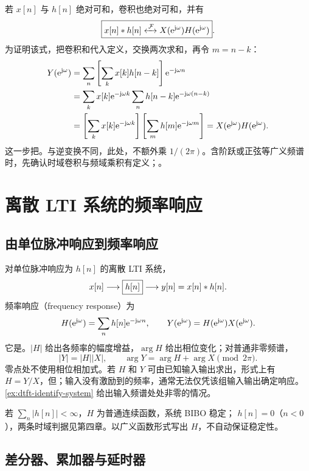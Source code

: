 若 $x[n]$ 与 $h[n]$ 绝对可和，卷积也绝对可和，并有
\begin{equation}
  \boxed{x[n]\mathbin{\ast} h[n]\mathrel{\xleftrightarrow{\,\mathcal{F}\,}}
    X(\mathrm{e}^{\mathrm{j}\omega})H(\mathrm{e}^{\mathrm{j}\omega})}.
  \label{eq:dtft-convolution}
\end{equation}
为证明该式，把卷积和代入定义，交换两次求和，再令 $m=n-k$：
\begin{align*}
  Y(\mathrm{e}^{\mathrm{j}\omega})
    &=\sum_n\left[\sum_k x[k]h[n-k]\right]\mathrm{e}^{-\mathrm{j}\omega n}\\
    &=\sum_k x[k]\mathrm{e}^{-\mathrm{j}\omega k}
      \sum_n h[n-k]\mathrm{e}^{-\mathrm{j}\omega(n-k)}\\
    &=\left[\sum_k x[k]\mathrm{e}^{-\mathrm{j}\omega k}\right]
      \left[\sum_m h[m]\mathrm{e}^{-\mathrm{j}\omega m}\right]
      =X(\mathrm{e}^{\mathrm{j}\omega})H(\mathrm{e}^{\mathrm{j}\omega}).
\end{align*}
这一步把。与逆变换不同，此处，不额外乘 $1/(2\pi)$。含阶跃或正弦等广义频谱时，先确认时域卷积与频域乘积有定义；。

\section{离散 LTI 系统的频率响应}
\label{sec:dtft-lti}

\subsection{由单位脉冲响应到频率响应}

对单位脉冲响应为 $h[n]$ 的离散 LTI 系统，
\[
  x[n]\longrightarrow\boxed{h[n]}\longrightarrow
  y[n]=x[n]\mathbin{\ast} h[n].
\]
频率响应（frequency response）为
\begin{equation}
  H(\mathrm{e}^{\mathrm{j}\omega})=\sum_n h[n]\mathrm{e}^{-\mathrm{j}\omega n},
  \qquad Y(\mathrm{e}^{\mathrm{j}\omega})=H(\mathrm{e}^{\mathrm{j}\omega})X(\mathrm{e}^{\mathrm{j}\omega}).
  \label{eq:dtft-lti-response}
\end{equation}
它是。$|H|$ 给出各频率的幅度增益，$\arg H$ 给出相位变化；对普通非零频谱，
\[
  |Y|=|H||X|,\qquad
  \arg Y=\arg H+\arg X\pmod{2\pi}.
\]
零点处不使用相位相加式。若 $H$ 和 $Y$ 可由已知输入输出求出，形式上有 $H=Y/X$，但；输入没有激励到的频率，通常无法仅凭该组输入输出确定响应。\cref{ex:dtft-identify-system} 给出输入频谱处处非零的情况。

若 $\sum_n|h[n]|<\infty$，$H$ 为普通连续函数，系统 BIBO 稳定； $h[n]=0$（$n<0$），两条时域判据见第四章。以广义函数形式写出 $H$，不自动保证稳定性。

\subsection{差分器、累加器与延时器}
\label{sec:dtft-elementary-systems}

